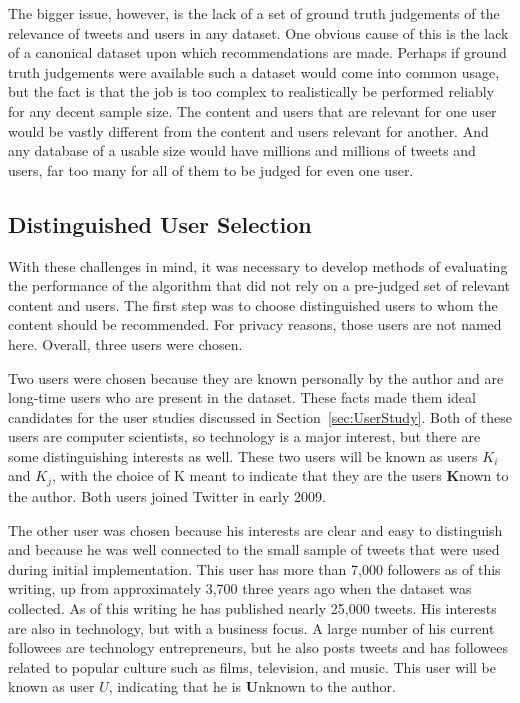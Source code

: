 The bigger issue, however, is the lack of a set of ground truth judgements of the relevance of tweets and users in any dataset. One obvious cause of this is the lack of a canonical dataset upon which recommendations are made. Perhaps if ground truth judgements were available such a dataset would come into common usage, but the fact is that the job is too complex to realistically be performed reliably for any decent sample size. The content and users that are relevant for one user would be vastly different from the content and users relevant for another. And any database of a usable size would have millions and millions of tweets and users, far too many for all of them to be judged for even one user.

\subsection{Distinguished User Selection}

With these challenges in mind, it was necessary to develop methods of evaluating the performance of the algorithm that did not rely on a pre-judged set of relevant content and users. The first step was to choose distinguished users to whom the content should be recommended. For privacy reasons, those users are not named here. Overall, three users were chosen.

Two users were chosen because they are known personally by the author and are long-time users who are present in the dataset. These facts made them ideal candidates for the user studies discussed in Section~\ref{sec:UserStudy}. Both of these users are computer scientists, so technology is a major interest, but there are some distinguishing interests as well. These two users will be known as users $K_{i}$ and $K_{j}$, with the choice of K meant to indicate that they are the users {\bf K}nown to the author. Both users joined Twitter in early 2009. 

The other user was chosen because his interests are clear and easy to distinguish and because he was well connected to the small sample of tweets that were used during initial implementation. This user has more than 7,000 followers as of this writing, up from approximately 3,700 three years ago when the dataset was collected. As of this writing he has published nearly 25,000 tweets. His interests are also in technology, but with a business focus. A large number of his current followees are technology entrepreneurs, but he also posts tweets and has followees related to popular culture such as films, television, and music. This user will be known as user $U$, indicating that he is {\bf U}nknown to the author.



